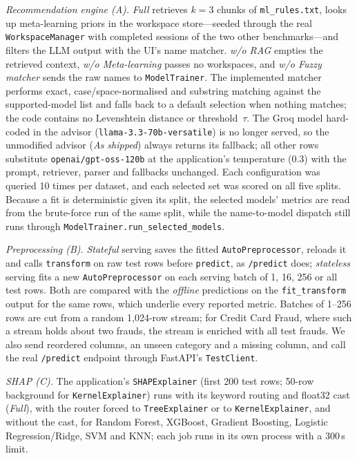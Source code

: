 \emph{Recommendation engine (A).} \emph{Full} retrieves $k{=}3$ chunks of \texttt{ml\_rules.txt}, looks up meta-learning priors in the workspace store---seeded through the real \texttt{WorkspaceManager} with completed sessions of the two other benchmarks---and filters the LLM output with the UI's name matcher. \emph{w/o RAG} empties the retrieved context, \emph{w/o Meta-learning} passes no workspaces, and \emph{w/o Fuzzy matcher} sends the raw names to \texttt{ModelTrainer}. The implemented matcher performs exact, case/space-normalised and substring matching against the supported-model list and falls back to a default selection when nothing matches; the code contains no Levenshtein distance or threshold~$\tau$. The Groq model hard-coded in the advisor (\texttt{llama-3.3-\allowbreak 70b-versatile}) is no longer served, so the unmodified advisor (\emph{As shipped}) always returns its fallback; all other rows substitute \texttt{openai/\allowbreak gpt-oss-120b} at the application's temperature (0.3) with the prompt, retriever, parser and fallbacks unchanged. Each configuration was queried 10 times per dataset, and each selected set was scored on all five splits. Because a fit is deterministic given its split, the selected models' metrics are read from the brute-force run of the same split, while the name-to-model dispatch still runs through \texttt{ModelTrainer.\allowbreak run\_selected\_models}.

\emph{Preprocessing (B).} \emph{Stateful} serving saves the fitted \texttt{AutoPreprocessor}, reloads it and calls \texttt{transform} on raw test rows before \texttt{predict}, as \texttt{/predict} does; \emph{stateless} serving fits a new \texttt{AutoPreprocessor} on each serving batch of 1, 16, 256 or all test rows. Both are compared with the \emph{offline} predictions on the \texttt{fit\_transform} output for the same rows, which underlie every reported metric. Batches of 1--256 rows are cut from a random 1{,}024-row stream; for Credit Card Fraud, where such a stream holds about two frauds, the stream is enriched with all test frauds. We also send reordered columns, an unseen category and a missing column, and call the real \texttt{/predict} endpoint through FastAPI's \texttt{TestClient}.

\emph{SHAP (C).} The application's \texttt{SHAPExplainer} (first 200 test rows; 50-row background for \texttt{KernelExplainer}) runs with its keyword routing and float32 cast (\emph{Full}), with the router forced to \texttt{TreeExplainer} or to \texttt{KernelExplainer}, and without the cast, for Random Forest, XGBoost, Gradient Boosting, Logistic Regression/Ridge, SVM and KNN; each job runs in its own process with a 300\,s limit.

